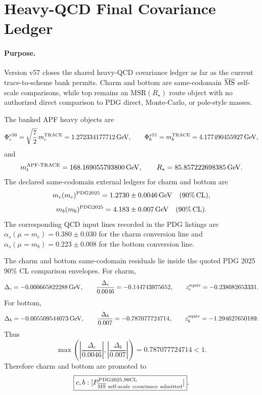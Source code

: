 \section{Heavy-QCD Final Covariance Ledger}
\label{sec:heavy-qcd-final-covariance-ledger-v57}

\paragraph{Purpose.}
Version v57 closes the shared heavy-QCD covariance ledger as far as the current
trace-to-scheme bank permits.  Charm and bottom are same-codomain
\(\overline{\rm MS}\) self-scale comparisons, while top remains an
\(\mathrm{MSR}(R_\star)\) route object with no authorized direct comparison to
PDG direct, Monte-Carlo, or pole-style masses.

\begin{definition}
The banked APF heavy objects are
\[
\Phi_c^{v50}=\sqrt{\frac72}\,m_c^{\rm TRACE}
=1.272334177712\,{\rm GeV},
\qquad
\Phi_b^{v51}=m_b^{\rm TRACE}
=4.177490455927\,{\rm GeV},
\]
and
\[
m_t^{\rm APF\text{-}TRACE}=168.169055793800\,{\rm GeV},
\qquad
R_\star=85.857222698385\,{\rm GeV}.
\]
The declared same-codomain external ledgers for charm and bottom are
\[
m_c(m_c)^{\rm PDG2025}=1.2730\pm 0.0046\,{\rm GeV}
\quad(90\%\,{\rm CL}),
\]
\[
m_b(m_b)^{\rm PDG2025}=4.183\pm 0.007\,{\rm GeV}
\quad(90\%\,{\rm CL}).
\]
The corresponding QCD input lines recorded in the PDG listings are
\(\alpha_s(\mu=m_c)=0.380\pm 0.030\) for the charm conversion
line and \(\alpha_s(\mu=m_b)=0.223\pm 0.008\) for the bottom
conversion line.
\end{definition}

\begin{theorem}
The charm and bottom same-codomain residuals lie inside the quoted PDG 2025
90\% CL comparison envelopes.  For charm,
\[
\Delta_c=-0.000665822288\,{\rm GeV},\qquad
\frac{\Delta_c}{0.0046}=-0.144743975652,\qquad
z_c^{\rm equiv}=-0.238082653331.
\]
For bottom,
\[
\Delta_b=-0.005509544073\,{\rm GeV},\qquad
\frac{\Delta_b}{0.007}=-0.787077724714,\qquad
z_b^{\rm equiv}=-1.294627650189.
\]
Thus
\[
\max\left(
\left|\frac{\Delta_c}{0.0046}\right|,
\left|\frac{\Delta_b}{0.007}\right|
\right)
=0.787077724714<1.
\]
Therefore charm and bottom are promoted to
\[
\boxed{c,b:[P_{\rm \overline{MS}\ self\text{-}scale\ covariance\ admitted}^{\rm PDG2025,90CL}]}.
\]
\end{theorem}

